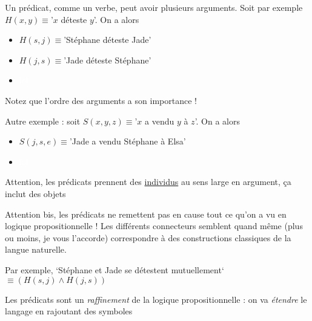 \begin{frame}
	
	Un prédicat, comme un verbe, peut avoir plusieurs arguments. Soit par exemple $H(x,y) \equiv $'$x$ déteste $y$'. On a alors \newline
	
	 \begin{itemize}
	 \item $H(s,j) \equiv $'Stéphane déteste Jade'
	\item $H(j,s) \equiv $'Jade déteste Stéphane'
	\item \textcolor{white}{lol}
	\end{itemize}
	
	 \pause
	 	
	Notez que l'ordre des arguments a son importance !
	
	\pause
	
	Autre exemple : soit $S(x,y,z) \equiv $'$x$ a vendu $y$ à $z$'. On a alors \newline
		
		 \begin{itemize}
	 \item $S(j,s,e) \equiv $'Jade a vendu Stéphane à Elsa'
	 \item \textcolor{white}{lol}
		\end{itemize}\pause
		
	Attention, les prédicats prennent des \underline{individus} au sens large en argument, ça inclut des objets
	

\end{frame}



\begin{frame}
	
	 Attention bis, les prédicats ne remettent pas en cause tout ce qu'on a vu en logique propositionnelle !  Les différents connecteurs semblent quand même (plus ou moins, je vous l'accorde) correspondre à des constructions classiques de la langue naturelle. \pause\newline
	 
	 Par exemple, `Stéphane et Jade se détestent mutuellement` $\equiv (H(s,j) \wedge H(j,s))$\pause\newline
	 
	 Les prédicats sont un \textit{raffinement} de la logique propositionnelle : on va \textit{étendre} le langage en rajoutant des symboles 
	 
\end{frame}



